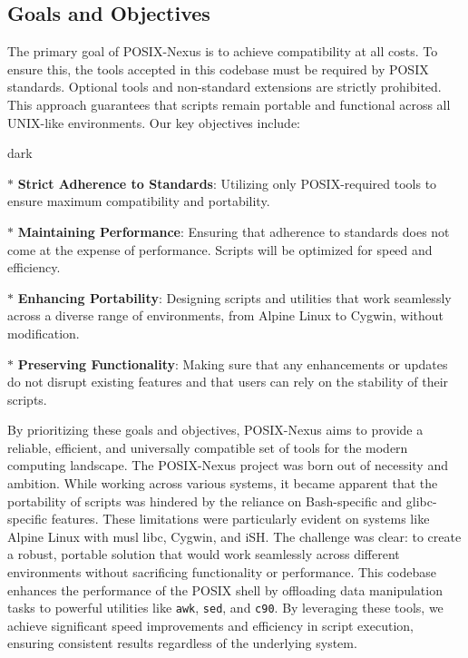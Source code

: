 \subsection{Goals and Objectives}
The primary goal of POSIX-Nexus is to achieve compatibility at all costs.
To ensure this, the tools accepted in this codebase must be required by POSIX standards.
Optional tools and non-standard extensions are strictly prohibited.
This approach guarantees that scripts remain portable and functional across all UNIX-like environments.
Our key objectives include:
\bigskip
\begin{baseBoxOne}{}{dark}
    \begin{posnexItemize}
        \item[$\ast$] \textbf{Strict Adherence to Standards}: Utilizing only POSIX-required tools to ensure maximum compatibility and portability. 
        \item[$\ast$] \textbf{Maintaining Performance}: Ensuring that adherence to standards does not come at the expense of performance. Scripts will be optimized for speed and efficiency. 
        \item[$\ast$] \textbf{Enhancing Portability}: Designing scripts and utilities that work seamlessly across a diverse range of environments, from Alpine Linux to Cygwin, without modification. 
        \item[$\ast$] \textbf{Preserving Functionality}: Making sure that any enhancements or updates do not disrupt existing features and that users can rely on the stability of their scripts. 
    \end{posnexItemize}
\end{baseBoxOne}
\bigskip
By prioritizing these goals and objectives, POSIX-Nexus aims to provide a reliable, efficient, and universally compatible set of tools for the modern computing landscape.
The POSIX-Nexus project was born out of necessity and ambition. While working across various systems, it became apparent that the portability of scripts was hindered by the reliance on Bash-specific and glibc-specific features. These limitations were particularly evident on systems like Alpine Linux with musl libc, Cygwin, and iSH. The challenge was clear: to create a robust, portable solution that would work seamlessly across different environments without sacrificing functionality or performance.
This codebase enhances the performance of the POSIX shell by offloading data manipulation tasks to powerful utilities like \texttt{awk}, \texttt{sed}, and \texttt{c90}. By leveraging these tools, we achieve significant speed improvements and efficiency in script execution, ensuring consistent results regardless of the underlying system.

